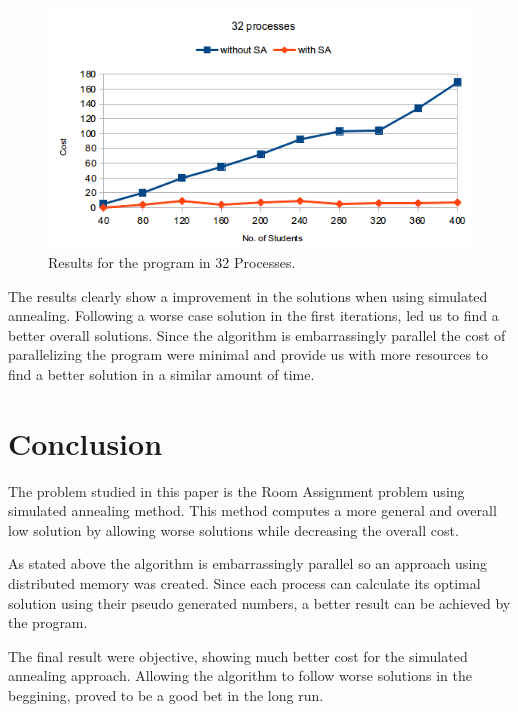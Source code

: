 \documentclass[a4paper,10pt,openright,openbib,twocolumn]{article}
\begin{document}
\begin{figure}[!htb]
    \centering
    \begin{minipage}[t]{\columnwidth}
        \includegraphics[width=\textwidth]{./img/arc4-32.png}
        \caption{Results for the program in 32 Processes.\label{fig:parallel}}
    \end{minipage}
\end{figure}

The results clearly show a improvement in the solutions when using simulated annealing. Following a worse case solution in the first iterations, led us to find a better overall solutions. Since the algorithm is embarrassingly parallel the cost of parallelizing the program were minimal and provide us with more resources to find a better solution in a similar amount of time. 

\section{Conclusion}

The problem studied in this paper is the Room Assignment problem using simulated annealing method. This method computes a more general and overall low solution by allowing worse solutions while decreasing the overall cost.

As stated above the algorithm is embarrassingly parallel so an approach using distributed memory was created. Since each process can calculate its optimal solution using their pseudo generated numbers, a better result can be achieved by the program.

The final result were objective, showing much better cost for the simulated annealing approach. Allowing the algorithm to follow worse solutions in the beggining, proved to be a good bet in the long run. 
\end{document}
